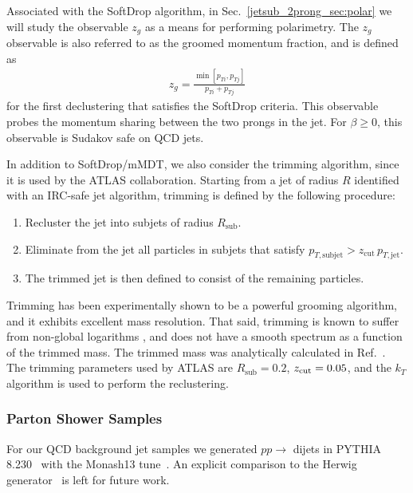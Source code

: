 \documentclass[11pt]{cernrep}
\begin{document}
Associated with the SoftDrop algorithm, in Sec.~\ref{jetsub_2prong_sec:polar} we will study the observable $z_g$ as a means for performing polarimetry.
%
The $z_g$ observable is also referred to as the groomed momentum fraction, and is defined as
%
\begin{align}
z_g=\frac{\min\left[ p_{Ti}, p_{Tj}  \right]}{p_{Ti}+p_{Tj}}
\end{align}
%
for the first declustering that satisfies the SoftDrop criteria.
%
This observable probes the momentum sharing between the two prongs in the
jet. For $\beta \ge 0$, this observable is Sudakov safe \cite{Larkoski:2013paa,Larkoski:2015lea} on QCD
jets.

In addition to SoftDrop/mMDT, we also consider the trimming algorithm, since it is used by the ATLAS collaboration.
%
Starting from a jet of radius $R$ identified with an IRC-safe jet algorithm, trimming is defined by the following procedure:
%
\begin{enumerate}
%
\item Recluster the jet into subjets of radius $R_{\text{sub}}$.
%
\item Eliminate from the jet all particles in subjets that satisfy
  $p_{T,\text{subjet}} > z_{\text{cut}} \, p_{T,\text{jet}}$.
%
\item The trimmed jet is then defined to consist of the remaining particles.
%
\end{enumerate}
%
Trimming has been experimentally shown to be a powerful grooming algorithm, and it exhibits excellent mass resolution.
%
That said, trimming is known to suffer from non-global logarithms \cite{Dasgupta:2001sh}, and does not have a smooth spectrum as a function of the trimmed mass.
%
The trimmed mass was analytically calculated in Ref.~\cite{Dasgupta:2013ihk}.
%
The trimming parameters used by ATLAS are $R_{\text{sub}}=0.2$,  $ {z_{\rm cut}}=0.05$, and the $k_T$ algorithm is used to perform the reclustering.


\subsubsection{Parton Shower Samples}\label{jetsub_2prong_sec:samples_sub}



For our QCD background jet samples we generated $pp\to$ dijets in
\textsc{PYTHIA} 8.230~\cite{Sjostrand:2006za,Sjostrand:2007gs} with
the Monash13 tune~\cite{Skands:2014pea}. 
%
An explicit comparison to the Herwig
generator~\cite{Bahr:2008pv,Bellm:2015jjp} is left for future work.
\end{document}
